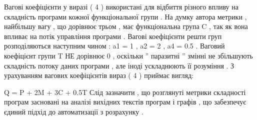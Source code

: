 \documentclass[oneside,final,14pt]{extreport}
\begin{document}
\begin{description}
Вагові коефіцієнти у виразі ( 4 ) використані для відбиття різного впливу на складність програми кожної функціональної групи . На думку автора метрики , найбільшу вагу , що дорівнює трьом , має функціональна група C , так як вона впливає на потік управління програми . Вагові коефіцієнти решти груп розподіляються наступним чином : a1 = 1 , a2 = 2 , a4 = 0.5 . Ваговий коефіцієнт групи T НЕ дорівнює 0 , оскільки '' паразитні '' змінні не збільшують складність потоку даних програми , але іноді ускладнюють її розуміння . З урахуванням вагових коефіцієнтів вираз ( 4 ) приймає вигляд:

Q = P + 2M + 3C + 0.5T
Слід зазначити , що розглянуті метрики складності програм засновані на аналізі вихідних текстів програм і графів , що забезпечує єдиний підхід до автоматизації з розрахунку .

\end{description}
\end{document}
